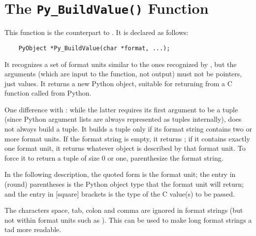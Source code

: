 \section{The {\tt Py_BuildValue()} Function}

This function is the counterpart to .  It is
declared as follows:

\begin{verbatim}
    PyObject *Py_BuildValue(char *format, ...);
\end{verbatim}

It recognizes a set of format units similar to the ones recognized by
, but the arguments (which are input to the
function, not output) must not be pointers, just values.  It returns a
new Python object, suitable for returning from a C function called
from Python.

One difference with : while the latter
requires its first argument to be a tuple (since Python argument lists
are always represented as tuples internally),  does
not always build a tuple.  It builds a tuple only if its format string
contains two or more format units.  If the format string is empty, it
returns ; if it contains exactly one format unit, it
returns whatever object is described by that format unit.  To force it
to return a tuple of size 0 or one, parenthesize the format string.

In the following description, the quoted form is the format unit; the
entry in (round) parentheses is the Python object type that the format
unit will return; and the entry in [square] brackets is the type of
the C value(s) to be passed.

The characters space, tab, colon and comma are ignored in format
strings (but not within format units such as ).  This can be
used to make long format strings a tad more readable.

